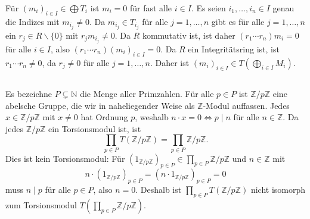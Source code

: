 \documentclass[a4paper,10pt]{article}
\theoremstyle{definition}
\newcommand{\N}{\mathbb{N}}
\newcommand{\Z}{\mathbb{Z}}
\begin{document}
Für $(m_i)_{i \in I} \in \bigoplus T_i$ ist $m_i = 0$ für fast alle $i \in I$. Es seien $i_1, \ldots, i_n \in I$ genau die Indizes mit $m_{i_j} \neq 0$. Da $m_{i_j} \in T_{i_j}$ für alle $j=1,\ldots,n$ gibt es für alle $j=1,\ldots,n$ ein $r_j \in R \smallsetminus \{0\}$ mit $r_j m_{i_j} \neq 0$. Da $R$ kommutativ ist, ist daher $(r_1 \cdots r_n) m_i = 0$ für alle $i \in I$, also $(r_1 \cdots r_n) (m_i)_{i \in I} = 0$. Da $R$ ein Integritätsring ist, ist $r_1 \cdots r_n \neq 0$, da $r_j \neq 0$ für alle $j=1,\ldots,n$. Daher ist $(m_i)_{i \in I} \in T(\bigoplus_{i \in I} M_i)$.


\subsection{}
Es bezeichne $P \subsetneq \N$ die Menge aller Primzahlen. Für alle $p \in P$ ist $\Z/p\Z$ eine abelsche Gruppe, die wir in naheliegender Weise als $\Z$-Modul auffassen. Jedes $x \in \Z/p\Z$ mit $x \neq 0$ hat Ordnung $p$, weshalb $n \cdot x = 0 \Leftrightarrow p \mid n$ für alle $n \in \Z$. Da jedes $\Z/p\Z$ ein Torsionsmodul ist, ist
\[
 \prod_{p \in P} T(\Z/p\Z) = \prod_{p \in P} \Z/p\Z.
\]
Dies ist kein Torsionsmodul: Für $(1_{\Z/p\Z})_{p \in P} \in \prod_{p \in P} \Z/p\Z$ und $n \in \Z$ mit
\[
 n \cdot (1_{\Z/p\Z})_{p \in P} = (n \cdot 1_{\Z/p\Z})_{p \in P} = 0
\]
muss $n \mid p$ für alle $p \in P$, also $n = 0$. Deshalb ist $\prod_{p \in P} T(\Z/p\Z)$ nicht isomorph zum Torsionsmodul $T(\prod_{p \in P} \Z/p\Z)$.
\end{document}
